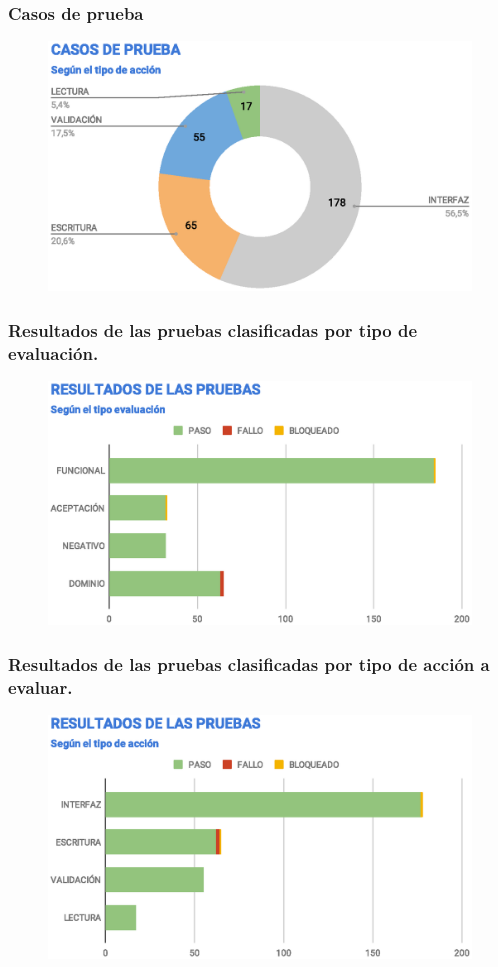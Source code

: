 \documentclass{beamer}
\begin{document}
\begin{frame}
\frametitle{Casos de prueba}
\begin{figure}
\centering
\includegraphics[width=1.0\textwidth]{graphics/tc-type.eps}
\end{figure}
\end{frame}

\begin{frame}
\frametitle{Resultados de las pruebas clasificadas por tipo de evaluación.}
\begin{figure}
\centering
\includegraphics[width=1.0\textwidth]{graphics/results-tests.eps}
\end{figure}
\end{frame}

\begin{frame}
\frametitle{Resultados de las pruebas clasificadas por tipo de acción a evaluar.}
\begin{figure}
\centering
\includegraphics[width=1.0\textwidth]{graphics/results-type.eps}
\end{figure}
\end{frame}
\end{document}
